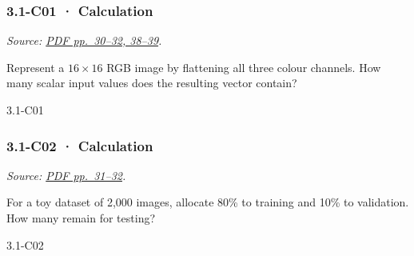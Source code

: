 \noindent\begin{minipage}{\linewidth}

\subsubsection{3.1-C01 · Calculation}\label{c01-calculation-7}

\emph{Source:
\href{../Lecture\%20Slides/3.1.\%20Introduction\%20to\%20Deep\%20Learning.pdf\#page=30}{PDF
pp.~30--32, 38--39}.}

Represent a \(16\times16\) RGB image by flattening all three colour
channels. How many scalar input values does the resulting vector
contain?

\begin{solution}[26mm]{3.1-C01}

\end{solution}
\end{minipage}\par\medskip

\noindent\begin{minipage}{\linewidth}

\subsubsection{3.1-C02 · Calculation}\label{c02-calculation-7}

\emph{Source:
\href{../Lecture\%20Slides/3.1.\%20Introduction\%20to\%20Deep\%20Learning.pdf\#page=31}{PDF
pp.~31--32}.}

For a toy dataset of 2,000 images, allocate 80\% to training and 10\% to
validation. How many remain for testing?

\begin{solution}[26mm]{3.1-C02}

\end{solution}
\end{minipage}\par\medskip

